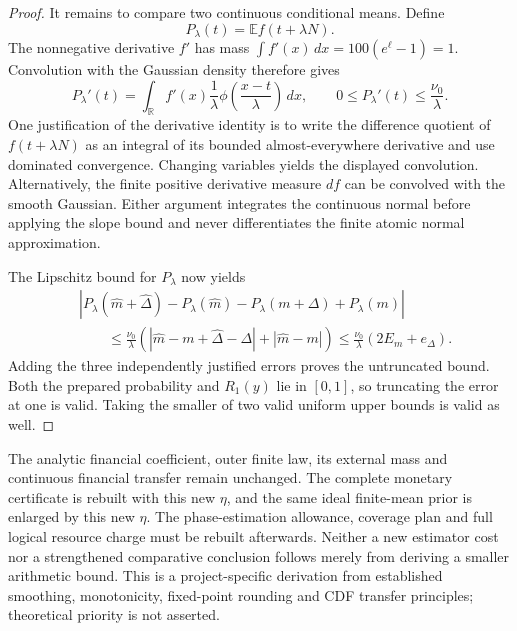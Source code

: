 \documentclass[11pt]{article}
\begin{document}
\begin{proof}
It remains to compare two continuous conditional means. Define
\begin{equation}
 P_\lambda(t)=\mathbb E f(t+\lambda N).
\end{equation}
The nonnegative derivative $f'$ has mass
$\int f'(x)\,dx=100(e^\ell-1)=1$. Convolution with the Gaussian density
therefore gives
\begin{equation}
 P_\lambda'(t)
 =\int_{\mathbb R} f'(x)\frac1\lambda
             \phi\left(\frac{x-t}{\lambda}\right)\,dx,
 \qquad 0\leq P_\lambda'(t)\leq\frac{\nu_0}{\lambda}.
\end{equation}
One justification of the derivative identity is to write the difference
quotient of $f(t+\lambda N)$ as an integral of its bounded almost-everywhere
derivative and use dominated convergence. Changing variables yields the
displayed convolution. Alternatively, the finite positive derivative
measure $df$ can be convolved with the smooth Gaussian. Either argument
integrates the continuous normal before applying the slope bound and
never differentiates the finite atomic normal approximation.

The Lipschitz bound for $P_\lambda$ now yields
\begin{align}
 &\left|P_\lambda(\widehat m+\widehat\Delta)
          -P_\lambda(\widehat m)
          -P_\lambda(m+\Delta)+P_\lambda(m)\right|\\
 &\qquad\leq\frac{\nu_0}{\lambda}
        \left(|\widehat m-m+\widehat\Delta-\Delta|
              +|\widehat m-m|\right)
 \leq\frac{\nu_0}{\lambda}(2E_m+e_\Delta).
\end{align}
Adding the three independently justified errors proves the untruncated
bound. Both the prepared probability and $R_1(y)$ lie in $[0,1]$, so
truncating the error at one is valid. Taking the smaller of two valid
uniform upper bounds is valid as well.
\end{proof}

The analytic financial coefficient, outer finite law, its external mass
and continuous financial transfer remain unchanged. The complete monetary
certificate is rebuilt with this new $\eta$, and the same ideal finite-mean
prior is enlarged by this new $\eta$. The phase-estimation allowance,
coverage plan and full logical resource charge must be rebuilt afterwards.
Neither a new estimator cost nor a strengthened comparative conclusion
follows merely from deriving a smaller arithmetic bound. This is a
project-specific derivation from established smoothing, monotonicity,
fixed-point rounding and CDF transfer principles; theoretical priority is
not asserted.
\end{document}
